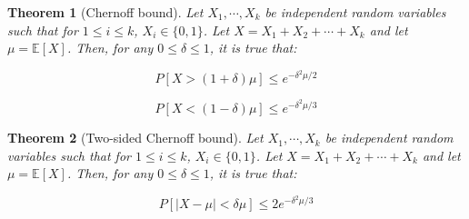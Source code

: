 \documentclass[11pt]{article}
\newtheorem{theorem}{Theorem}[section]
\newcommand{\E}{\mathbb{E}}
\begin{document}
\begin{theorem}[Chernoff bound] Let $X_1, \cdots, X_k$ be independent random variables such that for $1 \leq i \leq k$, $X_i \in\{0,1\}$. Let $X = X_1 + X_2 + \cdots + X_k$ and let $\mu = \E[X]$. Then, for any $0 \leq \delta \leq 1$, it is true that:

\begin{equation}
	P[X > (1 + \delta) \mu] \leq e^{-\delta^2 \mu/2}\label{eq:chernoff_upper}
\end{equation}	
	
\begin{equation}
	P[X < (1 - \delta) \mu] \leq e^{-\delta^2 \mu/3}\label{eq:chernoff_lower}
\end{equation}	
\end{theorem}


\begin{theorem}[Two-sided Chernoff bound] Let $X_1, \cdots, X_k$ be independent random variables such that for $1 \leq i \leq k$, $X_i \in\{0,1\}$. Let $X = X_1 + X_2 + \cdots + X_k$ and let $\mu = \E[X]$. Then, for any $0 \leq \delta \leq 1$, it is true that:

\begin{equation}
	P[|X - \mu| < \delta \mu] \leq 2e^{-\delta^2 \mu/3}\label{eq:chernoff_twosided}
\end{equation}	
	
\end{theorem}
\end{document}
